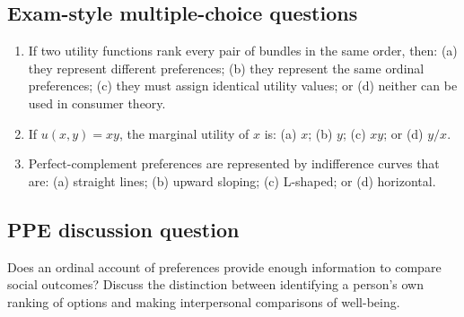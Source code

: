 \subsection*{Exam-style multiple-choice questions}
\begin{enumerate}[resume,label=\arabic*.]
  \item If two utility functions rank every pair of bundles in the same order, then: (a) they represent different preferences; (b) they represent the same ordinal preferences; (c) they must assign identical utility values; or (d) neither can be used in consumer theory.
  \item If $u(x,y)=xy$, the marginal utility of $x$ is: (a) $x$; (b) $y$; (c) $xy$; or (d) $y/x$.
  \item Perfect-complement preferences are represented by indifference curves that are: (a) straight lines; (b) upward sloping; (c) L-shaped; or (d) horizontal.
\end{enumerate}

\subsection*{PPE discussion question}

\noindent Does an ordinal account of preferences provide enough information to compare social outcomes? Discuss the distinction between identifying a person's own ranking of options and making interpersonal comparisons of well-being.
